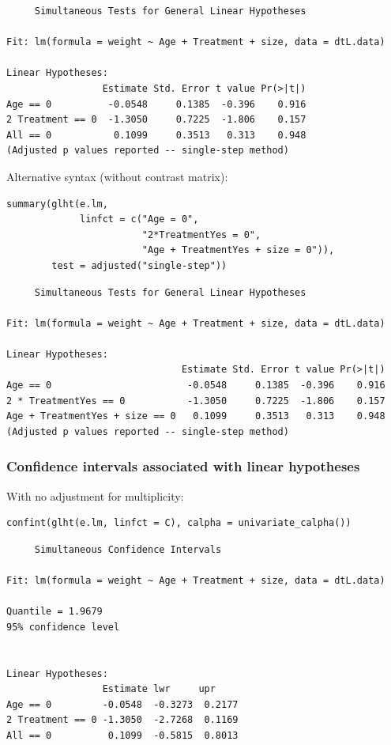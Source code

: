 \documentclass{article}
\begin{document}
\begin{verbatim}
	 Simultaneous Tests for General Linear Hypotheses

Fit: lm(formula = weight ~ Age + Treatment + size, data = dtL.data)

Linear Hypotheses:
                 Estimate Std. Error t value Pr(>|t|)
Age == 0          -0.0548     0.1385  -0.396    0.916
2 Treatment == 0  -1.3050     0.7225  -1.806    0.157
All == 0           0.1099     0.3513   0.313    0.948
(Adjusted p values reported -- single-step method)
\end{verbatim}

Alternative syntax (without contrast matrix):
\lstset{language=r,label= ,caption= ,captionpos=b,numbers=none}
\begin{lstlisting}
summary(glht(e.lm, 
			 linfct = c("Age = 0",
						"2*TreatmentYes = 0",
						"Age + TreatmentYes + size = 0")), 
		test = adjusted("single-step"))
\end{lstlisting}

\begin{verbatim}
	 Simultaneous Tests for General Linear Hypotheses

Fit: lm(formula = weight ~ Age + Treatment + size, data = dtL.data)

Linear Hypotheses:
                               Estimate Std. Error t value Pr(>|t|)
Age == 0                        -0.0548     0.1385  -0.396    0.916
2 * TreatmentYes == 0           -1.3050     0.7225  -1.806    0.157
Age + TreatmentYes + size == 0   0.1099     0.3513   0.313    0.948
(Adjusted p values reported -- single-step method)
\end{verbatim}

\subsubsection{Confidence intervals associated with linear hypotheses}
\label{sec:org8573b08}

With no adjustment for multiplicity:
\lstset{language=r,label= ,caption= ,captionpos=b,numbers=none}
\begin{lstlisting}
confint(glht(e.lm, linfct = C), calpha = univariate_calpha())
\end{lstlisting}

\begin{verbatim}
	 Simultaneous Confidence Intervals

Fit: lm(formula = weight ~ Age + Treatment + size, data = dtL.data)

Quantile = 1.9679
95% confidence level
 

Linear Hypotheses:
                 Estimate lwr     upr    
Age == 0         -0.0548  -0.3273  0.2177
2 Treatment == 0 -1.3050  -2.7268  0.1169
All == 0          0.1099  -0.5815  0.8013
\end{verbatim}
\end{document}
